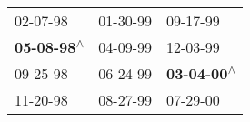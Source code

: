 \begin{supertabular}{lll}
                  02-07-98\textsuperscript{} &  01-30-99\textsuperscript{} &                   09-17-99\textsuperscript{} \\
 \textbf{05-08-98\textsuperscript{$\wedge$}} &  04-09-99\textsuperscript{} &                   12-03-99\textsuperscript{} \\
                  09-25-98\textsuperscript{} &  06-24-99\textsuperscript{} &  \textbf{03-04-00\textsuperscript{$\wedge$}} \\
                  11-20-98\textsuperscript{} &  08-27-99\textsuperscript{} &                   07-29-00\textsuperscript{} \\
\end{supertabular}
